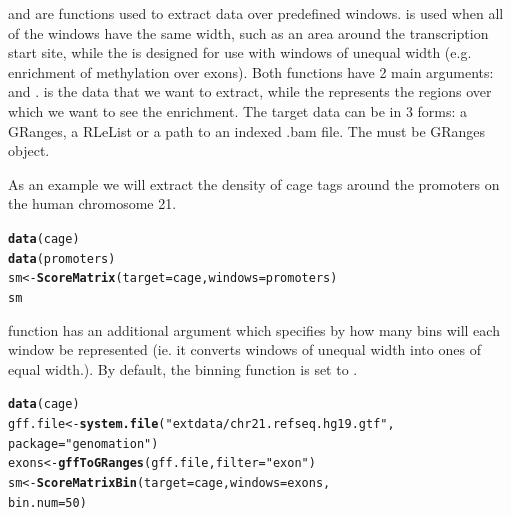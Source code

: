 \documentclass{article}\usepackage[]{graphicx}\usepackage[]{color}
\makeatletter
\newcommand{\hlnum}[1]{\textcolor[rgb]{0.686,0.059,0.569}{#1}}%
\newcommand{\hlstr}[1]{\textcolor[rgb]{0.192,0.494,0.8}{#1}}%
\newcommand{\hlstd}[1]{\textcolor[rgb]{0.345,0.345,0.345}{#1}}%
\newcommand{\hlkwb}[1]{\textcolor[rgb]{0.69,0.353,0.396}{#1}}%
\newcommand{\hlkwc}[1]{\textcolor[rgb]{0.333,0.667,0.333}{#1}}%
\newcommand{\hlkwd}[1]{\textcolor[rgb]{0.737,0.353,0.396}{\textbf{#1}}}%
\newenvironment{kframe}{%
 \def\at@end@of@kframe{}%
 \ifinner\ifhmode%
  \def\at@end@of@kframe{\end{minipage}}%
  \begin{minipage}{\columnwidth}%
 \fi\fi%
 \def\FrameCommand##1{\hskip\@totalleftmargin \hskip-\fboxsep
 \colorbox{shadecolor}{##1}\hskip-\fboxsep
     \hskip-\linewidth \hskip-\@totalleftmargin \hskip\columnwidth}%
 \MakeFramed {\advance\hsize-\width
   \@totalleftmargin\z@ \linewidth\hsize
   \@setminipage}}%
 {\par\unskip\endMakeFramed%
 \at@end@of@kframe}
\newenvironment{knitrout}{}{} %
\makeatother
\begin{document}
 and  are functions used to extract 
data over predefined windows.  is used when all of the windows
have the same width, such as an area around the transcription start site, while the
 is designed for use with windows of unequal width 
(e.g. enrichment of methylation over exons).
Both functions have 2 main arguments:  and 
.  is the data that we want to extract, while the 
represents the regions over which we want to see the enrichment. The target data
can be in 3 forms: a GRanges, a RLeList or a path to an indexed .bam file.
The  must be GRanges object.

As an example we will extract the density of cage tags around the promoters on 
the human chromosome 21.
\begin{knitrout}
\color{fgcolor}\begin{kframe}
\begin{alltt}
\hlkwd{data}\hlstd{(cage)}
\hlkwd{data}\hlstd{(promoters)}
\hlstd{sm} \hlkwb{<-} \hlkwd{ScoreMatrix}\hlstd{(}\hlkwc{target} \hlstd{= cage,} \hlkwc{windows} \hlstd{= promoters)}
\hlstd{sm}
\end{alltt}
\end{kframe}
\end{knitrout}



 function has an additional  argument which
specifies by how many bins will each window be represented (ie. it converts windows
of unequal width into ones of equal width.). By default, the binning function is set
to .
\begin{knitrout}
\color{fgcolor}\begin{kframe}
\begin{alltt}
\hlkwd{data}\hlstd{(cage)}
\hlstd{gff.file} \hlkwb{<-} \hlkwd{system.file}\hlstd{(}\hlstr{"extdata/chr21.refseq.hg19.gtf"}\hlstd{,}
    \hlkwc{package} \hlstd{=} \hlstr{"genomation"}\hlstd{)}
\hlstd{exons} \hlkwb{<-} \hlkwd{gffToGRanges}\hlstd{(gff.file,} \hlkwc{filter} \hlstd{=} \hlstr{"exon"}\hlstd{)}
\hlstd{sm} \hlkwb{<-} \hlkwd{ScoreMatrixBin}\hlstd{(}\hlkwc{target} \hlstd{= cage,} \hlkwc{windows} \hlstd{= exons,}
    \hlkwc{bin.num} \hlstd{=} \hlnum{50}\hlstd{)}
\end{alltt}
\end{kframe}
\end{knitrout}
\end{document}
